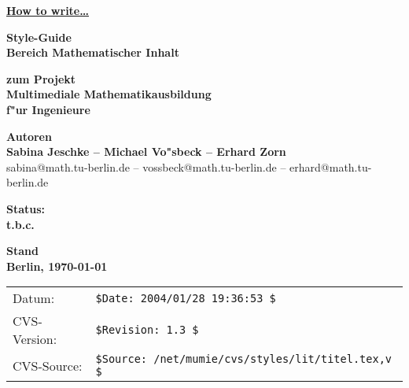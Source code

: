 
\pagestyle{empty}

\phantom{a}
\vspace{10mm}

\begin{center}

\underline{\underline{\Huge\bf How to write\dots }}

\vspace{22mm}

{\Large\bf Style-Guide}\\[2ex]
{\large\bf Bereich Mathematischer Inhalt}

\vspace{22mm}

{\Large\bf zum Projekt}\\[2ex]
{\large\bf Multimediale Mathematikausbildung}\\[1ex]
{\large\bf f"ur Ingenieure}

\vspace{22mm}

{\Large\bf Autoren}\\[2ex]
{\large\bf Sabina Jeschke -- Michael Vo"sbeck -- Erhard Zorn}\\[1ex]
sabina@math.tu-berlin.de -- vossbeck@math.tu-berlin.de -- erhard@math.tu-berlin.de

\vspace{10mm}

{\Large\bf Status:}\\[2ex]
{\large\bf t.b.c.}

\vspace{10mm}

{\Large\bf Stand}\\[2ex]
{\large\bf Berlin, \today}

\vspace{10mm}

\begin{tabular}{ll}
\textsf{Datum:}&
   \verb+$Date: 2004/01/28 19:36:53 $+\\ %
\textsf{CVS-Version:}&
   \verb+$Revision: 1.3 $+\\            %
\textsf{CVS-Source:}&
   \verb+$Source: /net/mumie/cvs/styles/lit/titel.tex,v $+\\            %
\end{tabular}
\end{center}

\newpage

\phantom{was auch immer...}

\setcounter{page}{0}

\clearpage

\pagestyle{plain}




